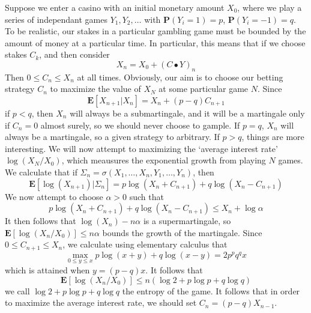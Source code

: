 \begin{example}
    Suppose we enter a casino with an initial monetary amount $X_0$, where we play a series of independant games $Y_1, Y_2, \dots$ with $\mathbf{P}(Y_i = 1) = p$, $\mathbf{P}(Y_i = -1) = q$. To be realistic, our stakes in a particular gambling game must be bounded by the amount of money at a particular time. In particular, this means that if we choose stakes $C_k$, and then consider
    \[ X_n = X_0 + (C \bullet Y)_n \]
    Then $0 \leq C_n \leq X_n$ at all times. Obviously, our aim is to choose our betting strategy $C_n$ to maximize the value of $X_N$ at some particular game $N$. Since
    \[ \mathbf{E}[X_{n+1}|X_n] = X_n + (p-q)C_{n+1} \]
    if $p < q$, then $X_n$ will always be a submartingale, and it will be a martingale only if $C_n = 0$ almost surely, so we should never choose to gample. If $p = q$, $X_n$ will always be a martingale, so a given strategy to arbitrary. If $p > q$, things are more interesting. We will now attempt to maximizing the `average interest rate' $\log(X_N/X_0)$, which meausures the exponential growth from playing $N$ games. We calculate that if $\Sigma_n = \sigma(X_1, \dots, X_n, Y_1, \dots, Y_n)$, then
    \[ \mathbf{E}[\log(X_{n+1})|\Sigma_n] = p\log(X_n + C_{n+1}) + q\log(X_n - C_{n+1}) \]
    We now attempt to choose $\alpha > 0$ such that
    \[ p \log(X_n + C_{n+1}) + q\log(X_n - C_{n+1}) \leq X_n + \log \alpha \]
    It then follows that $\log(X_n) - n\alpha$ is a supermartingale, so $\mathbf{E}[\log(X_n/X_0)] \leq n\alpha$ bounds the growth of the martingale. Since $0 \leq C_{n+1} \leq X_n$, we calculate using elementary calculus that
    \[ \max_{0 \leq y \leq x} p\log(x + y) + q\log(x-y) = 2p^p q^q x \]
    which is attained when $y = (p-q)x$. It follows that
    \[ \mathbf{E}[\log(X_n/X_0)] \leq n (\log 2 + p \log p + q \log q) \]
    we call $\log 2 + p \log p + q \log q$ the entropy of the game. It follows that in order to maximize the average interest rate, we should set $C_n = (p-q)X_{n-1}$.
\end{example}

